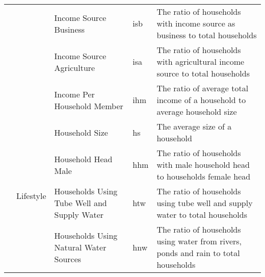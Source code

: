 \begin{table*}[!ht]
{\begin{tabular}{|l|l|p{5.1cm}|l|p{9.5cm}|}
                            &                                           & Income Source Business                          & isb              & The ratio of households with income source as business to total households                                                                                                                                 \\ \cline{3-5} 
                            &                                           & Income Source Agriculture                       & isa              & The ratio of households with agricultural income source to total households                                                                                                                              \\ \cline{3-5} 
                            &                                           & Income Per Household Member                     & ihm              & The ratio of average total income of a household to average household size                                                                                                                                                     \\ \cline{2-5} 
                            & \multirow{6}{*}{Lifestyle}                & Household Size                                  & hs               & The average size of a household                                                                                                                                                                            \\ \cline{3-5} 
                            &                                           & Household Head Male                             & hhm              & The ratio of households with male household head to households female head                                                                                                                              \\ \cline{3-5} 
                            &                                           & Households Using Tube Well and Supply Water     & htw              & The ratio of households using tube well and supply water to total households                                                                                                                                      \\ \cline{3-5} 
                            &                                           & Households Using Natural Water Sources                    & hnw              & The ratio of households using water from rivers, ponds and rain to total households                                                                                                                                           \\ \cline{3-5} 

\end{tabular}}
\end{table*}
